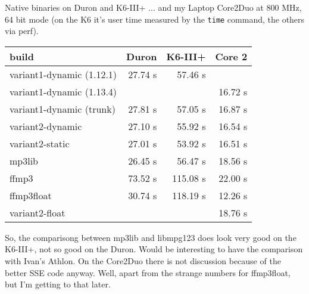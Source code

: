 \documentclass[a4paper,12pt]{scrartcl}
\begin{document}
Native binaries on Duron and K6-III+ ... and my Laptop Core2Duo at 800 MHz, 64 bit mode (on the K6 it's user time measured by the \verb:time: command, the others via perf).
\begin{tabular}{lrrr}
build                     & Duron   &  K6-III+ & Core 2 \\
\hline
variant1-dynamic (1.12.1) & 27.74 s &  57.46 s &         \\
variant1-dynamic (1.13.4) &         &          & 16.72 s \\
variant1-dynamic (trunk)  & 27.81 s &  57.05 s & 16.87 s \\
variant2-dynamic          & 27.10 s &  55.92 s & 16.54 s \\
variant2-static           & 27.01 s &  53.92 s & 16.51 s \\
mp3lib                    & 26.45 s &  56.47 s & 18.56 s \\
ffmp3                     & 73.52 s & 115.08 s & 22.00 s \\
ffmp3float                & 30.74 s & 118.19 s & 12.26 s \\
variant2-float            &         &          & 18.76 s
\end{tabular}
So, the comparisong between mp3lib and libmpg123 does look very good on the K6-III+, not so good on the Duron.
Would be interesting to have the comparison with Ivan's Athlon.
On the Core2Duo there is not discussion because of the better SSE code anyway. Well, apart from the strange numbers for ffmp3float, but I'm getting to that later.
\end{document}
